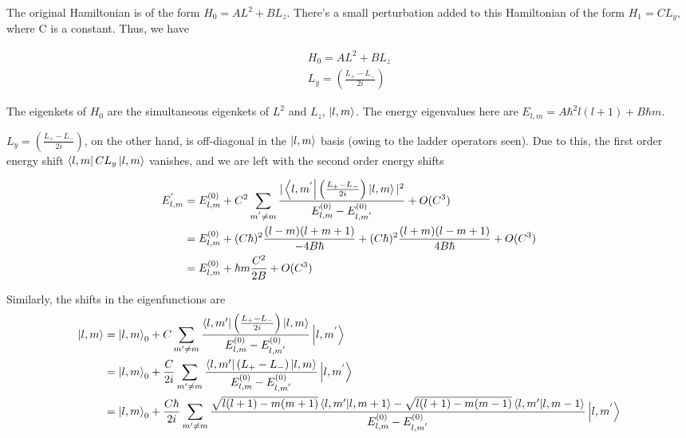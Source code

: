 \question


    The original Hamiltonian is of the form $H_0 = AL^2 + BL_z$. There's a small perturbation added to this Hamiltonian of the form $H_1 = CL_y$, where C is a constant. Thus, we have

    \begin{gather*}
        H_0 = AL^2 + BL_z \\
        L_y = \left( \frac{L_+ - L_-}{2i} \right)
    \end{gather*}

    The eigenkets of $H_0$ are the simultaneous eigenkets of $L^2$ and $L_z$, $\ket{l,m}$. The energy eigenvalues here are $E_{l,m} = A\hbar^2l(l+1) + B\hbar m$.

    $L_y = \left( \frac{L_+ - L_-}{2i} \right)$, on the other hand, is off-diagonal in the $\ket{l,m}$ basis (owing to the ladder operators seen). Due to this, the first order energy shift $\bra{l,m}CL_y\ket{l,m}$ vanishes, and we are left with the second order energy shifts

    \begin{equation*}
        \begin{split}
            E^{'}_{l,m} & = E_{l,m}^{(0)} + C^2\sum_{m^{'} \neq m} \frac{|\bra{l,m^{'}}\left( \frac{L_+ - L_-}{2i} \right)\ket{l,m}|^2}{E_{l,m}^{(0)} - E_{l,m^{'}}^{(0)}} + O(C^3) \\
            & = E_{l,m}^{(0)} + (C\hbar)^2\frac{(l-m)(l + m + 1)}{-4B\hbar} + (C\hbar)^2\frac{(l+m)(l - m + 1)}{4B\hbar} + O(C^3) \\
            & = E_{l,m}^{(0)} + \hbar m \frac{C^2}{2B} + O(C^3)
        \end{split}
    \end{equation*}

    Similarly, the shifts in the eigenfunctions are
    \begin{equation*}
        \begin{split}
           \ket{l,m} & = \ket{l,m}_0 + C\sum_{m' \neq m} \frac{\bra{l,m'}\left( \frac{L_+ - L_-}{2i} \right)\ket{l,m}}{E_{l,m}^{(0)} - E_{l,m^{'}}^{(0)}} \ket{l,m^{'}} \\
           & = \ket{l,m}_0 + \frac{C}{2i}\sum_{m' \neq m} \frac{\bra{l,m'}\left( L_+ - L_- \right)\ket{l,m}}{E_{l,m}^{(0)} - E_{l,m^{'}}^{(0)}} \ket{l,m^{'}}\\
           & = \ket{l,m}_0 + \frac{C\hbar}{2i}\sum_{m' \neq m} \frac{\sqrt{l(l+1) - m(m+1)}\bra{l,m'}\ket{l,m+1} - \sqrt{l(l+1) - m(m-1)}\bra{l,m'}\ket{l,m-1}}{E_{l,m}^{(0)} - E_{l,m^{'}}^{(0)}} \ket{l,m^{'}}
        \end{split}
    \end{equation*}


